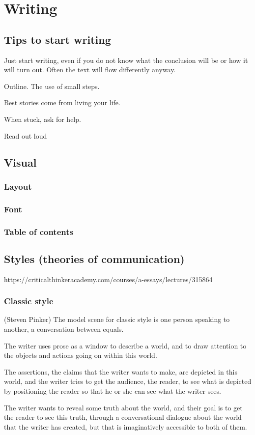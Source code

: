\documentclass{report}
\begin{document}
\chapter{Writing}
\section{Tips to start writing}
Just start writing, even if you do not know what the conclusion will be or how it will turn out. Often the text will flow differently anyway.

Outline. The use of small steps.

Best stories come from living your life.

When stuck, ask for help.

Read out loud
\section{Visual}
\subsection{Layout}
\subsection{Font}
\subsection{Table of contents}
\section{Styles (theories of communication)}
https://criticalthinkeracademy.com/courses/a-essays/lectures/315864
\subsection{Classic style}
(Steven Pinker)
The model scene for classic style is one person speaking to another, a conversation between equals.

The writer uses prose as a window to describe a world, and to draw attention to the objects and actions going on within this world.

The assertions, the claims that the writer wants to make, are depicted in this world, and the writer tries to get the audience, the reader, to see what is depicted by positioning the reader so that he or she can see what the writer sees.

The writer wants to reveal some truth about the world, and their goal is to get the reader to see this truth, through a conversational dialogue about the world that the writer has created, but that is imaginatively accessible to both of them.
\end{document}
